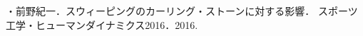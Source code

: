 \documentclass[main]{subfiles}
\begin{document}
{}
・前野紀一．スウィーピングのカーリング・ストーンに対する影響．
スポーツ工学・ヒューマンダイナミクス2016．2016.
\printbibliography[title=参考文献]
\end{document}
